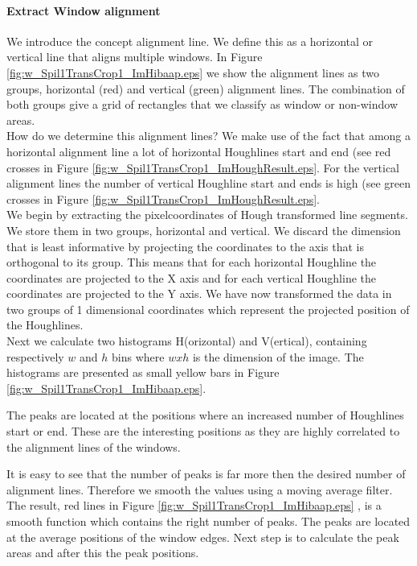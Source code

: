 \paragraph{Extract Window alignment}
We introduce the concept alignment line. We define this as a horizontal or
vertical line that aligns multiple windows. In Figure
\ref{fig:w_Spil1TransCrop1_ImHibaap.eps}
we show the alignment lines as two groups, horizontal (red) and
vertical (green) alignment lines.  The combination of both groups give a grid of
rectangles that we classify as window or non-window areas.\\

How do we determine this alignment lines? We make use of the fact that among a
horizontal alignment line a lot of horizontal Houghlines start and end (see red
crosses in Figure \ref{fig:w_Spil1TransCrop1_ImHoughResult.eps}. For the vertical alignment lines
the number of vertical Houghline start and ends is high (see green crosses in
Figure \ref{fig:w_Spil1TransCrop1_ImHoughResult.eps}.\\

We begin by extracting the pixelcoordinates of Hough transformed line
segments. We store them in two groups, horizontal and vertical.%
We discard the dimension that is least informative by projecting the coordinates to
the axis that is orthogonal to its group. 
This means that for each horizontal Houghline the coordinates are projected to the X
axis and for each vertical Houghline the coordinates are projected to the Y
axis. We have now transformed the data in two groups of 1 dimensional
coordinates which represent the projected position of the Houghlines.\\

Next we calculate two histograms H(orizontal) and V(ertical), containing respectively
$w$ and $h$ bins where $w x h$ is the dimension of the image.  The histograms
are presented as small yellow bars in Figure \ref{fig:w_Spil1TransCrop1_ImHibaap.eps}.

The peaks are located at the positions where an increased number of Houghlines
start or end.  These are the interesting positions as they are highly correlated
to the alignment lines of the windows. 

It is easy to see that the number of peaks is far more then the desired number of alignment lines.
Therefore we smooth the values using a moving average filter.
The result, red lines in Figure \ref{fig:w_Spil1TransCrop1_ImHibaap.eps}
, is a smooth function which contains the right number of peaks. The peaks
are located at the average positions of the window edges. Next step is to
calculate the peak areas and after this the peak positions. 

